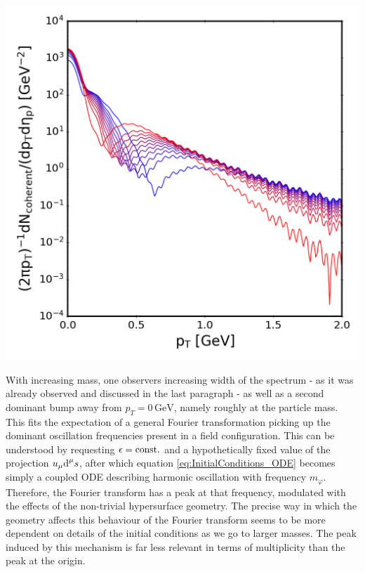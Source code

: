{\begin{minipage}{\linewidth}
{\begin{minipage}{0.4\linewidth}
                \includegraphics[width=\linewidth]{code/C++/DCCspec/images/spectra_real_consteps_20240826_143341_m1000_spec.png}        
            \end{minipage}
        }
        \label{fig:SpecRealConstEps_m1000}
    \end{minipage}
}
With increasing mass, one observers increasing width of the spectrum - as it was already observed and discussed in the last paragraph - as well as a second dominant bump away from $p_T=0\,\text{GeV}$, namely roughly at the particle mass. This fits the expectation of a general Fourier transformation picking up the dominant oscillation frequencies present in a field configuration. This can be understood by requesting ${\epsilon={\text{const.}}}$ and a hypothetically fixed value of the projection ${u_\mu\text{d}^\mu s}$, after which equation \eqref{eq:InitialConditions_ODE} becomes simply a coupled ODE describing harmonic oscillation with frequency $m_\varphi$. Therefore, the Fourier transform has a peak at that frequency, modulated with the effects of the non-trivial hypersurface geometry. The precise way in which the geometry affects this behaviour of the Fourier transform seems to be more dependent on details of the initial conditions as we go to larger masses. The peak induced by this mechanism is far less relevant in terms of multiplicity than the peak at the origin.

